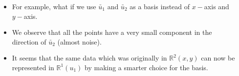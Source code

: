 \documentclass[10pt, aspectratio=169]{beamer}
\begin{document}
\begin{frame}
  \begin{columns}

    \begin{column}{0.5\textwidth}
      \centering
    \end{column}
      

    \begin{column}{0.5\textwidth}
      \begin{itemize}
        \item<1-> For example, what if we use $\utilde{u_1}$ and $\utilde{u_2}$ as a basis instead of $x-$axis and $y-$axis.
		\item<2-> We observe that all the points have a
very small component in the direction of $\utilde{u_2}$ (almost noise).
		\item<3-> It seems that the same data which was originally in $\mathbb{R}^2 (x, y)$ can now be represented in $\mathbb{R}^1(u_1)$ by making a smarter choice for the basis.
        \end{itemize}
    \end{column}

  \end{columns}
\end{frame}
\end{document}
